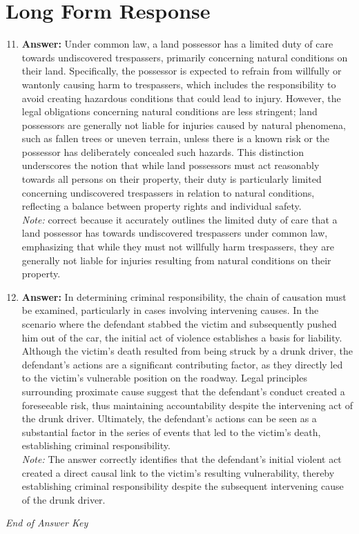 \documentclass[12pt]{article}
\begin{document}
\section*{Long Form Response}
\begin{enumerate}[label=\arabic*.]
\setcounter{enumi}{10}
\item \textbf{Answer:} Under common law, a land possessor has a limited duty of care towards undiscovered trespassers, primarily concerning natural conditions on their land. Specifically, the possessor is expected to refrain from willfully or wantonly causing harm to trespassers, which includes the responsibility to avoid creating hazardous conditions that could lead to injury. However, the legal obligations concerning natural conditions are less stringent; land possessors are generally not liable for injuries caused by natural phenomena, such as fallen trees or uneven terrain, unless there is a known risk or the possessor has deliberately concealed such hazards. This distinction underscores the notion that while land possessors must act reasonably towards all persons on their property, their duty is particularly limited concerning undiscovered trespassers in relation to natural conditions, reflecting a balance between property rights and individual safety.
\\ \textit{Note:} correct because it accurately outlines the limited duty of care that a land possessor has towards undiscovered trespassers under common law, emphasizing that while they must not willfully harm trespassers, they are generally not liable for injuries resulting from natural conditions on their property.
\item \textbf{Answer:} In determining criminal responsibility, the chain of causation must be examined, particularly in cases involving intervening causes. In the scenario where the defendant stabbed the victim and subsequently pushed him out of the car, the initial act of violence establishes a basis for liability. Although the victim's death resulted from being struck by a drunk driver, the defendant's actions are a significant contributing factor, as they directly led to the victim's vulnerable position on the roadway. Legal principles surrounding proximate cause suggest that the defendant's conduct created a foreseeable risk, thus maintaining accountability despite the intervening act of the drunk driver. Ultimately, the defendant's actions can be seen as a substantial factor in the series of events that led to the victim's death, establishing criminal responsibility.
\\ \textit{Note:} The answer correctly identifies that the defendant's initial violent act created a direct causal link to the victim's resulting vulnerability, thereby establishing criminal responsibility despite the subsequent intervening cause of the drunk driver.
\end{enumerate}

\vfill
\noindent\textit{End of Answer Key}
\end{document}
